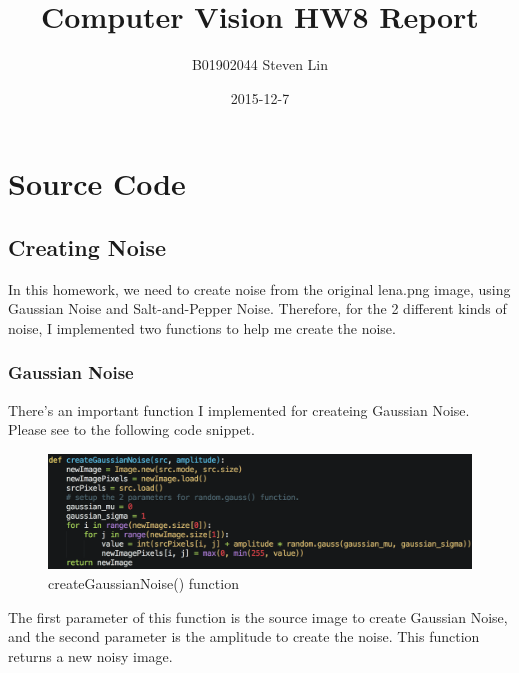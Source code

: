 \documentclass{article}
\title{Computer Vision HW8 Report}
\author{B01902044 Steven Lin}
\date{2015-12-7}
\begin{document}
\maketitle
\newpage


\tableofcontents
\newpage

\section{Source Code}

\subsection{Creating Noise}
In this homework, we need to create noise from the original lena.png image, using Gaussian Noise and Salt-and-Pepper Noise. Therefore, for the 2 different kinds of noise, I implemented two functions to help me create the noise.
\subsubsection{Gaussian Noise}
There's an important function I implemented for createing Gaussian Noise. Please see to the following code snippet.
\begin{figure}[H]
  \includegraphics[width=\linewidth]{img/create_gaussian_noise.png}
  \caption{createGaussianNoise() function}
  \label{fig:create_gaussian_noise}
\end{figure}
The first parameter of this function is the source image to create Gaussian Noise, and the second parameter is the amplitude to create the noise. This function returns a new noisy image.
\end{document}
